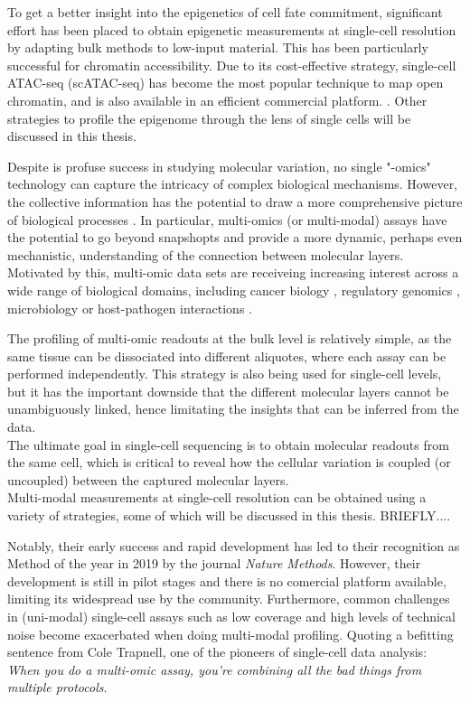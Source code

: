 To get a better insight into the epigenetics of cell fate commitment, significant effort has been placed to obtain epigenetic measurements at single-cell resolution by adapting bulk methods to low-input material. This has been particularly successful for chromatin accessibility. Due to its cost-effective strategy, single-cell ATAC-seq (scATAC-seq) has become the most popular technique to map open chromatin, and is also available in an efficient commercial platform. \cite{Cusanovich2015,Cao2018,Chen2018}. Other strategies to profile the epigenome through the lens of single cells will be discussed in this thesis. 

Despite is profuse success in studying molecular variation, no single "-omics" technology can capture the intricacy of complex biological mechanisms. However, the collective information has the potential to draw a more comprehensive picture of biological processes \cite{Hasin2017,Ritchie2015}. In particular, multi-omics (or multi-modal) assays have the potential to go beyond snapshopts and provide a more dynamic, perhaps even mechanistic, understanding of the connection between molecular layers. Motivated by this, multi-omic data sets are receiveing increasing interest across a wide range of biological domains, including cancer biology \cite{Akavia2010,Gerstung2015}, regulatory genomics \cite{Chen2016}, microbiology \cite{Kim2016} or host-pathogen interactions \cite{Soderholm2016}. 

The profiling of multi-omic readouts at the bulk level is relatively simple, as the same tissue can be dissociated into different aliquotes, where each assay can be performed independently. This strategy is also being used for single-cell levels, but it has the important downside that the different molecular layers cannot be unambiguously linked, hence limitating the insights that can be inferred from the data.\\
The ultimate goal in single-cell sequencing is to obtain molecular readouts from the same cell, which is critical to reveal how the cellular variation is coupled (or uncoupled) between the captured molecular layers.\\
Multi-modal measurements at single-cell resolution can be obtained using a variety of strategies, some of which will be discussed in this thesis. BRIEFLY....


Notably, their early success and rapid development has led to their recognition as Method of the year in 2019 by the journal \textit{Nature Methods}. However, their development is still in pilot stages and there is no comercial platform available, limiting its widespread use by the community. Furthermore, common challenges in (uni-modal) single-cell assays such as low coverage and high levels of technical noise become exacerbated when doing multi-modal profiling. Quoting a befitting sentence from Cole Trapnell, one of the pioneers of single-cell data analysis: \textit{When you do a multi-omic assay, you're combining all the bad things from multiple protocols}.

